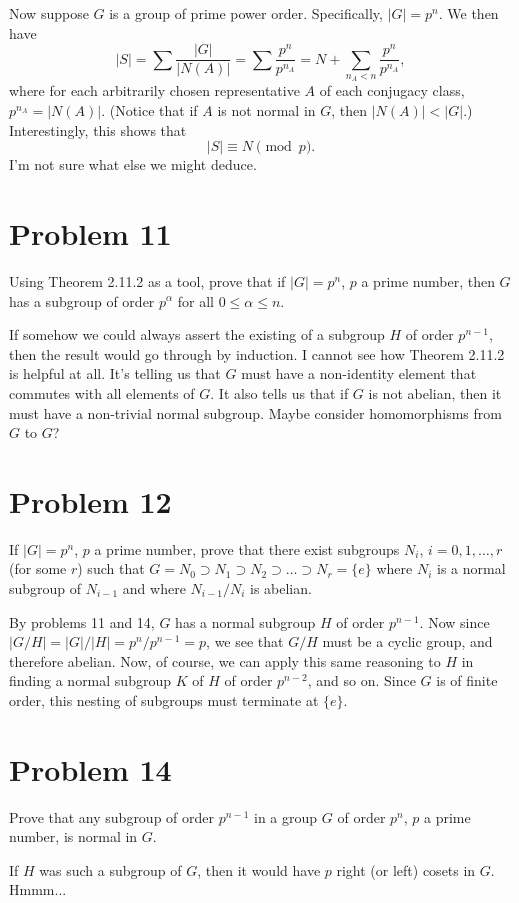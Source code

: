 \documentclass[12pt]{article}
\begin{document}
Now suppose $G$ is a group of prime power order.  Specifically, $|G|=p^n$.
We then have
\begin{equation*}
|S| = \sum\frac{|G|}{|N(A)|}=\sum\frac{p^n}{p^{n_A}}=  N+\sum_{n_A<n}\frac{p^n}{p^{n_A}},
\end{equation*}
where for each arbitrarily chosen representative $A$ of each conjugacy class, $p^{n_A}=|N(A)|$.
(Notice that if $A$ is not normal in $G$, then $|N(A)|<|G|$.)  Interestingly, this shows that
\begin{equation*}
|S|\equiv N\pmod{p}.
\end{equation*}
I'm not sure what else we might deduce.

\section*{Problem 11}

Using Theorem 2.11.2 as a tool, prove that if $|G|=p^n$, $p$ a prime number,
then $G$ has a subgroup of order $p^{\alpha}$ for all $0\leq\alpha\leq n$.

If somehow we could always assert the existing of a subgroup $H$ of order $p^{n-1}$,
then the result would go through by induction.  I cannot see how Theorem 2.11.2 is helpful at all.
It's telling us that $G$ must have a non-identity element that commutes with all elements of $G$.
It also tells us that if $G$ is not abelian, then it must have a non-trivial normal subgroup.
Maybe consider homomorphisms from $G$ to $G$?

\section*{Problem 12}

If $|G|=p^n$, $p$ a prime number, prove that there exist subgroups
$N_i$, $i=0,1,\dots,r$ (for some $r$) such that $G=N_0\supset N_1\supset N_2\supset\dots\supset N_r=\{e\}$
where $N_i$ is a normal subgroup of $N_{i-1}$ and where $N_{i-1}/N_i$ is abelian.

By problems 11 and 14, $G$ has a normal subgroup $H$ of order $p^{n-1}$.  Now since $|G/H|=|G|/|H|=p^n/p^{n-1}=p$,
we see that $G/H$ must be a cyclic group, and therefore abelian.
Now, of course, we can apply this same reasoning to $H$ in finding a normal subgroup $K$ of $H$ of order $p^{n-2}$,
and so on.  Since $G$ is of finite order, this nesting of subgroups must terminate at $\{e\}$.

\section*{Problem 14}

Prove that any subgroup of order $p^{n-1}$ in a group $G$ of order $p^n$, $p$ a prime number, is normal in $G$.

If $H$ was such a subgroup of $G$, then it would have $p$ right (or left) cosets in $G$.  Hmmm...
\end{document}
